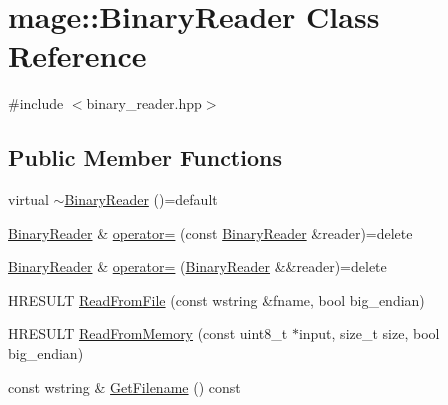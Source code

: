 \hypertarget{classmage_1_1_binary_reader}{}\section{mage\+:\+:Binary\+Reader Class Reference}
\label{classmage_1_1_binary_reader}


{\ttfamily \#include $<$binary\+\_\+reader.\+hpp$>$}

\subsection*{Public Member Functions}
\begin{DoxyCompactItemize}
\item 
virtual \hyperlink{classmage_1_1_binary_reader_aa300382cfa1585bb2f76c4e764bb5617}{$\sim$\+Binary\+Reader} ()=default
\item 
\hyperlink{classmage_1_1_binary_reader}{Binary\+Reader} \& \hyperlink{classmage_1_1_binary_reader_a0408bb456983b4a03ae42ab69c6f4bc3}{operator=} (const \hyperlink{classmage_1_1_binary_reader}{Binary\+Reader} \&reader)=delete
\item 
\hyperlink{classmage_1_1_binary_reader}{Binary\+Reader} \& \hyperlink{classmage_1_1_binary_reader_abb971fe92727a0e86b3698dba8c586de}{operator=} (\hyperlink{classmage_1_1_binary_reader}{Binary\+Reader} \&\&reader)=delete
\item 
H\+R\+E\+S\+U\+LT \hyperlink{classmage_1_1_binary_reader_ad1d395eabc03da0a52fc0df59623e0a4}{Read\+From\+File} (const wstring \&fname, bool big\+\_\+endian)
\item 
H\+R\+E\+S\+U\+LT \hyperlink{classmage_1_1_binary_reader_ac0bf066e76b7ac0f5308109ae431007d}{Read\+From\+Memory} (const uint8\+\_\+t $\ast$input, size\+\_\+t size, bool big\+\_\+endian)
\item 
const wstring \& \hyperlink{classmage_1_1_binary_reader_a10a0ec56fe7f8e63964ffca2afe019a3}{Get\+Filename} () const
\end{DoxyCompactItemize}

